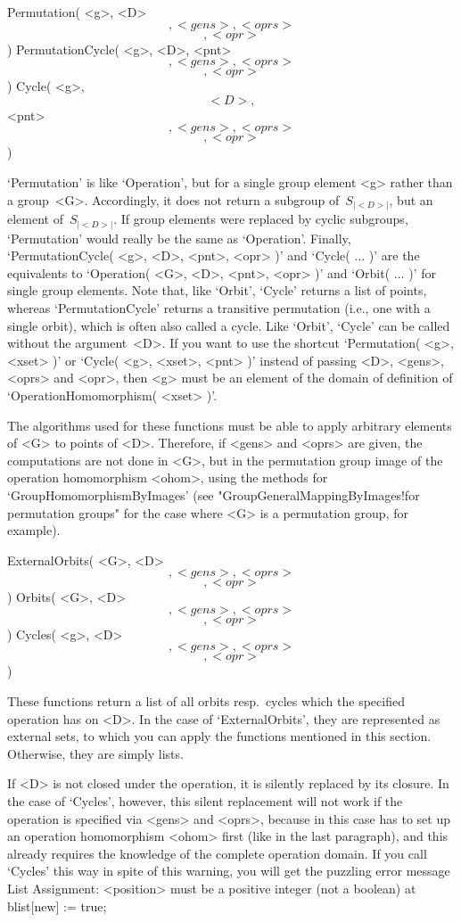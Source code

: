 \>Permutation( <g>, <D> \[, <gens>, <oprs> \] \[, <opr> \] )
\>PermutationCycle( <g>, <D>, <pnt> \[, <gens>, <oprs> \] \[, <opr> \] )
\>Cycle( <g>, \[ <D>, \] <pnt> \[, <gens>, <oprs> \] \[, <opr> \] )

`Permutation' is like   `Operation', but for  a single  group element <g>
rather  than  a  group~<G>. Accordingly,  it does   not return a subgroup
of~$S_{|<D>|}$, but an  element  of~$S_{|<D>|}$. If group elements   were
replaced  by cyclic subgroups, `Permutation'  would really be the same as
`Operation'. Finally, `PermutationCycle(  <g>, <D>,  <pnt>, <opr> )'  and
`Cycle( $\ldots$ )' are the  equivalents to `Operation( <G>, <D>,  <pnt>,
<opr> )'  and `Orbit( $\ldots$ )' for  single group  elements. Note that,
like   `Orbit',   `Cycle'      returns  a  list     of    points, whereas
`PermutationCycle' returns a transitive   permutation (i.e., one  with  a
single orbit), which is often also called  a cycle. Like `Orbit', `Cycle'
can be called without the  argument~<D>. If you want  to use the shortcut
`Permutation( <g>, <xset> )' or `Cycle( <g>, <xset>,  <pnt> )' instead of
passing <D>, <gens>, <oprs> and <opr>, then <g> must be an element of the
domain of definition of `OperationHomomorphism( <xset> )'.

The algorithms used for  these functions must  be able to apply arbitrary
elements of <G> to  points of <D>. Therefore,   if <gens> and <oprs>  are
given, the computations are not done in <G>, but in the permutation group
image  of  the  operation homomorphism   <ohom>, using   the methods  for
`GroupHomomorphismByImages'      (see    "GroupGeneralMappingByImages!for
permutation groups"  for the case where <G>  is  a permutation group, for
example).

\>ExternalOrbits( <G>, <D> \[, <gens>, <oprs> \] \[, <opr> \] )
%
\>Orbits( <G>, <D> \[, <gens>, <oprs> \] \[, <opr> \] )
%
\>Cycles( <g>, <D> \[, <gens>, <oprs> \] \[, <opr> \] )

These functions  return  a list  of  all  orbits resp.~cycles  which  the
specified operation has on <D>. In the case of `ExternalOrbits', they are
represented  as  external sets,  to which   you  can apply the  functions
mentioned in this section. Otherwise, they are simply lists.

If <D> is not closed under the operation, it is  silently replaced by its
closure. In  the case of `Cycles', however,  this silent replacement will
not work if the operation is specified via  <gens> and <oprs>, because in
this  case {\GAP} has  to set up  an  operation homomorphism <ohom> first
(like in the last paragraph), and this  already requires the knowledge of
the complete operation domain. If you call `Cycles'  this way in spite of
this warning, you will get the puzzling error message
\begintt
    List Assignment: <position> must be a positive integer (not a boolean) at
    blist[new] := true;
\endtt

